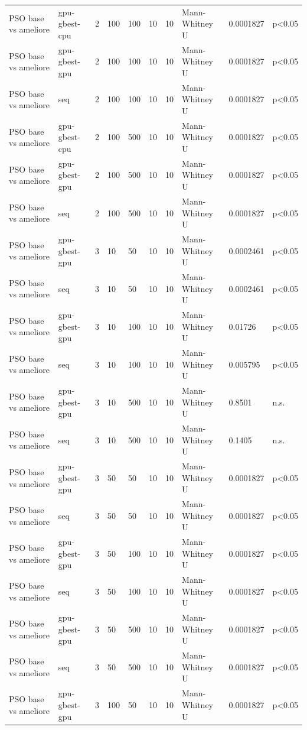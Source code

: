 \begin{table}[t]
\begin{tabular}{llllllllll}
PSO base vs ameliore & gpu-gbest-cpu & 2 & 100 & 100 & 10 & 10 & Mann-Whitney U & 0.0001827 & p<0.05 \\
PSO base vs ameliore & gpu-gbest-gpu & 2 & 100 & 100 & 10 & 10 & Mann-Whitney U & 0.0001827 & p<0.05 \\
PSO base vs ameliore & seq & 2 & 100 & 100 & 10 & 10 & Mann-Whitney U & 0.0001827 & p<0.05 \\
PSO base vs ameliore & gpu-gbest-cpu & 2 & 100 & 500 & 10 & 10 & Mann-Whitney U & 0.0001827 & p<0.05 \\
PSO base vs ameliore & gpu-gbest-gpu & 2 & 100 & 500 & 10 & 10 & Mann-Whitney U & 0.0001827 & p<0.05 \\
PSO base vs ameliore & seq & 2 & 100 & 500 & 10 & 10 & Mann-Whitney U & 0.0001827 & p<0.05 \\
PSO base vs ameliore & gpu-gbest-gpu & 3 & 10 & 50 & 10 & 10 & Mann-Whitney U & 0.0002461 & p<0.05 \\
PSO base vs ameliore & seq & 3 & 10 & 50 & 10 & 10 & Mann-Whitney U & 0.0002461 & p<0.05 \\
PSO base vs ameliore & gpu-gbest-gpu & 3 & 10 & 100 & 10 & 10 & Mann-Whitney U & 0.01726 & p<0.05 \\
PSO base vs ameliore & seq & 3 & 10 & 100 & 10 & 10 & Mann-Whitney U & 0.005795 & p<0.05 \\
PSO base vs ameliore & gpu-gbest-gpu & 3 & 10 & 500 & 10 & 10 & Mann-Whitney U & 0.8501 & n.s. \\
PSO base vs ameliore & seq & 3 & 10 & 500 & 10 & 10 & Mann-Whitney U & 0.1405 & n.s. \\
PSO base vs ameliore & gpu-gbest-gpu & 3 & 50 & 50 & 10 & 10 & Mann-Whitney U & 0.0001827 & p<0.05 \\
PSO base vs ameliore & seq & 3 & 50 & 50 & 10 & 10 & Mann-Whitney U & 0.0001827 & p<0.05 \\
PSO base vs ameliore & gpu-gbest-gpu & 3 & 50 & 100 & 10 & 10 & Mann-Whitney U & 0.0001827 & p<0.05 \\
PSO base vs ameliore & seq & 3 & 50 & 100 & 10 & 10 & Mann-Whitney U & 0.0001827 & p<0.05 \\
PSO base vs ameliore & gpu-gbest-gpu & 3 & 50 & 500 & 10 & 10 & Mann-Whitney U & 0.0001827 & p<0.05 \\
PSO base vs ameliore & seq & 3 & 50 & 500 & 10 & 10 & Mann-Whitney U & 0.0001827 & p<0.05 \\
PSO base vs ameliore & gpu-gbest-gpu & 3 & 100 & 50 & 10 & 10 & Mann-Whitney U & 0.0001827 & p<0.05 \\

\end{tabular}
\end{table}
